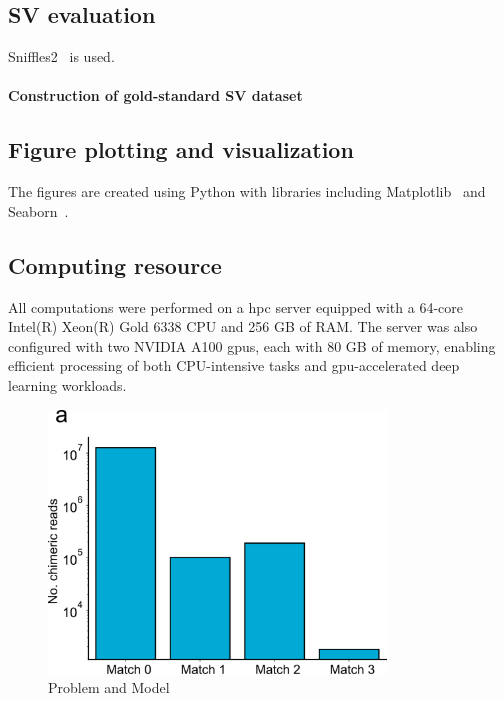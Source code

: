 \documentclass[pdflatex,sn-nature]{sn-jnl}%
\theoremstyle{thmstyleone}%
\theoremstyle{thmstyletwo}%
\theoremstyle{thmstylethree}%
\begin{document}
\subsection*{SV evaluation}

Sniffles2~\cite{Sedlazeck2018, Smolka2024} is used.

\paragraph*{Construction of gold-standard SV dataset}


\subsection*{Figure plotting and visualization}

The figures are created using Python with libraries including Matplotlib~\cite{Hunter2007} and Seaborn~\cite{Waskom2021}.

\subsection*{Computing resource}

All computations were performed on a \gls{hpc} server equipped with a 64-core Intel(R) Xeon(R) Gold 6338 CPU and 256 GB of RAM.
The server was also configured with two NVIDIA A100 \glspl{gpu}, each with 80 GB of memory, enabling efficient processing of both CPU-intensive tasks and \gls{gpu}-accelerated deep learning workloads.

\backmatter


\makeatletter
\renewcommand{\theHfigure}{extended.\thefigure}
\renewcommand{\theHtable}{extended.\thetable}
\makeatother

\renewcommand{\figurename}{Extended Data Fig.}
\renewcommand{\tablename}{Extended Data Table}
\setcounter{figure}{0}
\setcounter{table}{0}

\begin{figure}[!ht]
	\begin{center}
		\includegraphics[width=0.8\textwidth]{final_figures/sf1}
	\end{center}
	\caption{Problem and Model}\label{fig:sf1}
\end{figure}
\end{document}
